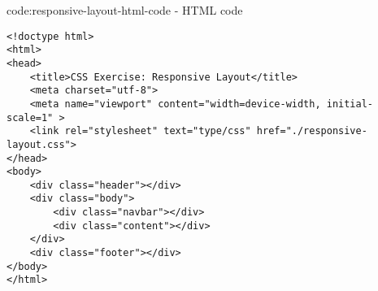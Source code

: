 \begin{code}{code:responsive-layout-html-code}{ - HTML code}
\begin{verbatim}
<!doctype html>
<html>
<head>
    <title>CSS Exercise: Responsive Layout</title>
    <meta charset="utf-8">
    <meta name="viewport" content="width=device-width, initial-scale=1" >
    <link rel="stylesheet" text="type/css" href="./responsive-layout.css">
</head>
<body>
    <div class="header"></div>
    <div class="body">
        <div class="navbar"></div>
        <div class="content"></div>
    </div>
    <div class="footer"></div>
</body>
</html>
\end{verbatim}
\end{code}
